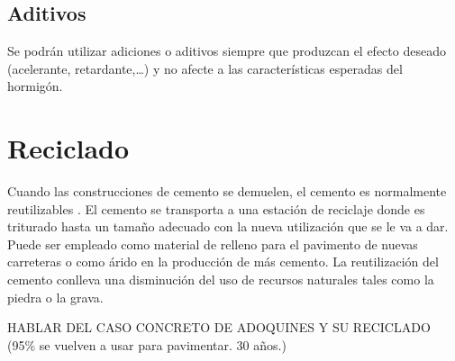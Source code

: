 \subsection{Aditivos}
Se podrán utilizar adiciones o aditivos siempre que produzcan el efecto deseado (acelerante, retardante,\ldots) y no afecte a las características esperadas del hormigón.

\section{Reciclado}
Cuando las construcciones de cemento se demuelen, el cemento es normalmente reutilizables \cite{jsjunnesson}. El cemento se transporta a una estación de reciclaje donde es triturado hasta un tamaño adecuado con la nueva utilización que se le va a dar. Puede ser empleado como material de relleno para el pavimento de nuevas carreteras o como árido en la producción de más cemento. La reutilización del cemento conlleva una disminución del uso de recursos naturales tales como la piedra o la grava.

HABLAR DEL CASO CONCRETO DE ADOQUINES Y SU RECICLADO (95\% se vuelven a usar para pavimentar. 30 años.)
